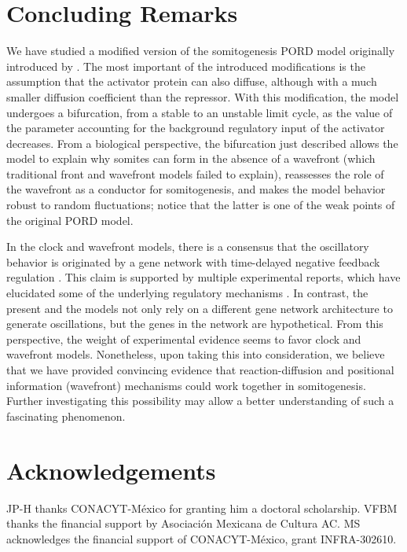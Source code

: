 \documentclass[11pt]{article}
\begin{document}
	
	\section{Concluding Remarks}
	\label{conclu}
	
	We have studied a modified version of the somitogenesis PORD model originally
	introduced by \citet{Cotterell2015}. The most important of the introduced
	modifications is the assumption that the activator protein can also diffuse,
	although with a much smaller diffusion coefficient than the repressor. With this
	modification, the model undergoes a bifurcation, from a stable to an unstable
	limit cycle, as the value of the parameter accounting for the background
	regulatory input of the activator decreases. From a biological perspective, the
	bifurcation just described allows the model to explain why somites can form in
	the absence of a wavefront (which traditional front and wavefront models failed
	to explain), reassesses the role of the wavefront as a conductor for
	somitogenesis, and makes the model behavior robust to random fluctuations;
	notice that the latter is one of the weak points of the original PORD model.  
	
	In the clock and wavefront models, there is a consensus that the oscillatory
	behavior is originated by a gene network with time-delayed negative feedback
	regulation \citep{Monk2003, Lewis2003}. This claim is supported by multiple
	experimental reports, which have elucidated some of the underlying regulatory
	mechanisms \citep{Schroter2012}. In contrast, the present and the
	\citet{Cotterell2015} models not only rely on a different gene network
	architecture to generate oscillations, but the genes in the network are
	hypothetical. From this perspective, the weight of experimental evidence seems
	to favor clock and wavefront models. Nonetheless, upon taking this into
	consideration, we
	believe that we have provided convincing evidence that reaction-diffusion and
	positional information (wavefront) mechanisms could work together in
	somitogenesis. Further investigating this possibility may allow a better
	understanding of such a fascinating phenomenon.
	
	
\section*{Acknowledgements}

JP-H thanks CONACYT-México for granting him a doctoral scholarship. VFBM thanks the financial support by Asociación Mexicana de Cultura AC. MS acknowledges the financial support of CONACYT-México, grant INFRA-302610. 
	
\end{document}
